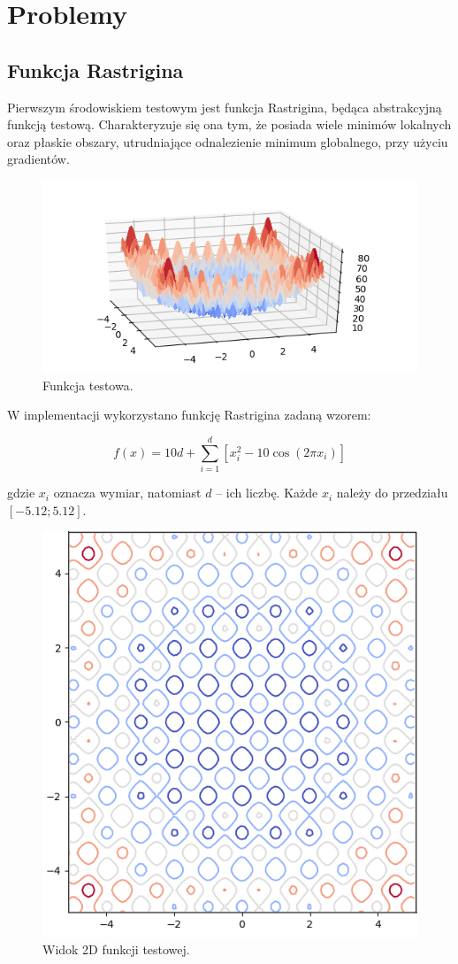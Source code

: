 \section{Problemy}

\subsection{Funkcja Rastrigina}

Pierwszym środowiskiem testowym jest funkcja Rastrigina, będąca abstrakcyjną funkcją testową. Charakteryzuje się ona tym, że posiada wiele minimów lokalnych oraz płaskie obszary, utrudniające odnalezienie minimum globalnego, przy użyciu gradientów.

\begin{figure}[H]
	\centering
	\includegraphics[width=\linewidth]{imgs/rastrigin_plot}
	\caption{Funkcja testowa.}
	\label{fig:rastrigin_plot}
\end{figure}

W implementacji wykorzystano funkcję Rastrigina zadaną wzorem:

$$f(x) = 10d + \sum_{i=1}^{d} [x_{i}^{2} - 10 \cos(2 \pi x_{i})]$$

gdzie $x_{i}$ oznacza wymiar, natomiast $d$ -- ich liczbę. Każde $x_{i}$ należy do przedziału $[-5.12; 5.12]$. 

\begin{figure}[H]
	\centering
	\includegraphics[width=0.4\linewidth]{imgs/rastrigin_2d_plot}
	\caption{Widok 2D funkcji testowej.}
	\label{fig:rastrigin_2d_plot}
\end{figure}


